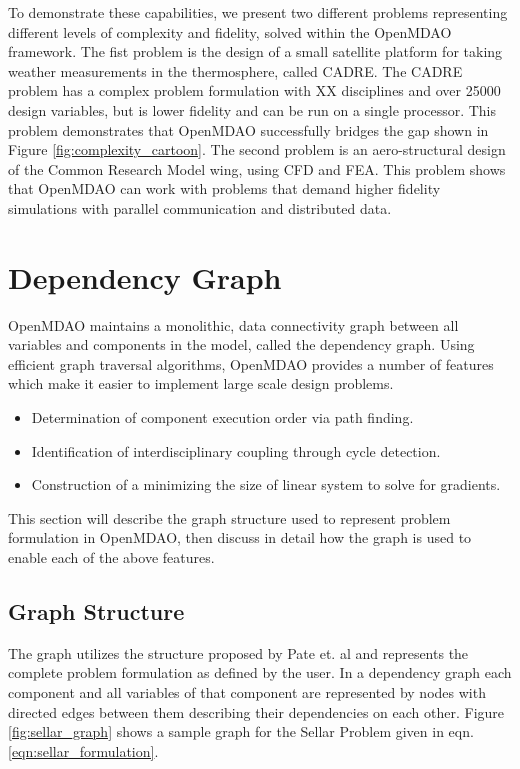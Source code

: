 \documentclass[]{aiaa-tc} %
\begin{document}
    To demonstrate these capabilities, we present two different problems representing different levels of
    complexity and fidelity, solved within the OpenMDAO framework. The fist problem is the design of a small
    satellite platform for taking weather measurements in the thermosphere, called CADRE. The CADRE problem has a
    complex problem formulation with XX disciplines and over 25000 design variables, but is lower fidelity and can
    be run on a single processor. This problem demonstrates that OpenMDAO successfully bridges the gap shown
    in Figure \ref{fig:complexity_cartoon}. The second problem is an aero-structural design of the Common Research
    Model wing, using CFD and FEA. This problem shows that OpenMDAO can work with problems that demand higher fidelity
    simulations with parallel communication and distributed data.

  \section{Dependency Graph}

    OpenMDAO maintains a monolithic, data connectivity graph between all
    variables and components in the model, called the dependency graph.
    Using efficient graph traversal algorithms, OpenMDAO provides a number of
    features which make it easier to implement large scale design problems.

    \begin{itemize}
      \item Determination of component execution order via path finding.
      \item Identification of interdisciplinary coupling through cycle detection.
      \item Construction of a minimizing the size of linear system to solve for gradients.
    \end{itemize}

    This section will describe the graph structure used to represent problem formulation in OpenMDAO,
    then discuss in detail how the graph is used to enable each of the above features.


    \subsection{Graph Structure}
    The graph utilizes the structure proposed by
    Pate et. al \cite{graph_problem2013} and represents the complete problem formulation as
    defined by the user. In a dependency graph each component and all variables of that component are
    represented by nodes with directed edges between them describing their dependencies on each other.
    Figure \ref{fig:sellar_graph} shows a sample graph for the Sellar Problem \cite{AIAA:sellar}
    given in eqn. \ref{eqn:sellar_formulation}.
\end{document}
